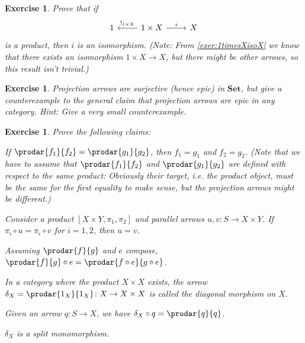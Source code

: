 \documentclass[article, a4paper, 11pt, oneside]{memoir}
\numberwithin{equation}{chapter}
\newcommand{\ncat}[1]{\mathbf{#1}} %
\newcommand{\catSet}{\ncat{Set}}
\theoremstyle{myexample}
\newtheorem{exercise}[theorem]{Exercise}
\theoremstyle{myexamplebreak}
\begin{document}
\begin{exercise}
    Prove that if
    \begin{equation*}
        \begin{tikzcd}
            1
            & 1 \times X
                \ar[l, "!_{1 \times X}", swap]
                \ar[r, "i"]
            & X
        \end{tikzcd}
    \end{equation*}
    is a product, then $i$ is an isomorphism. (Note: From \cref{exer:1timesXisoX} we know that there \emph{exists} an isomorphism $1 \times X \to X$, but there might be other arrows, so this result isn't trivial.)
\end{exercise}


\begin{exercise}
    Projection arrows are surjective (hence epic) in $\catSet$, but give a counterexample to the general claim that projection arrows are epic in any category. \emph{Hint:} Give a very small counterexample.
\end{exercise}


\begin{exercise}
    Prove the following claims:
    \begin{enumexercise}
        \item If $\prodar{f_1}{f_2} = \prodar{g_1}{g_2}$, then $f_1 = g_1$ and $f_2 = g_2$. (Note that we have to assume that $\prodar{f_1}{f_2}$ and $\prodar{g_1}{g_2}$ are defined with respect to the same product: Obviously their target, i.e. the product \emph{object}, must be the same for the first equality to make sense, but the \emph{projection arrows} might be different.)
        
        \item Consider a product $[X \times Y, \pi_1, \pi_2]$ and parallel arrows $u,v \colon S \to X \times Y$. If $\pi_i \circ u = \pi_i \circ v$ for $i = 1,2$, then $u = v$.
        
        \item Assuming $\prodar{f}{g}$ and $e$ compose, $\prodar{f}{g} \circ e = \prodar{f \circ e}{g \circ e}$.
    \end{enumexercise}
    In a category where the product $X \times X$ exists, the arrow $\delta_X = \prodar{1_X}{1_X} \colon X \to X \times X$ is called the \emph{diagonal morphism} on $X$.
    \begin{enumexercise}[resume*]
        \item Given an arrow $q \colon S \to X$, we have $\delta_X \circ q = \prodar{q}{q}$.

        \item $\delta_X$ is a split monomorphism.
    \end{enumexercise}
\end{exercise}
\end{document}
